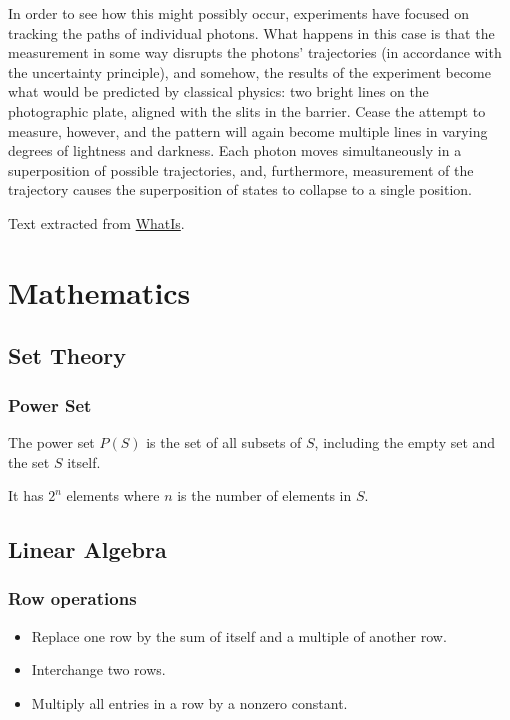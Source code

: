 \documentclass[oneside]{book} %
\theoremstyle{plain}
\begin{document}
In order to see how this might possibly occur, experiments have focused on
tracking the paths of individual photons. What happens in this case is that the
measurement in some way disrupts the photons' trajectories (in accordance with
the uncertainty principle), and somehow, the results of the experiment become
what would be predicted by classical physics: two bright lines on the
photographic plate, aligned with the slits in the barrier. Cease the attempt to
measure, however, and the pattern will again become multiple lines in varying
degrees of lightness and darkness. Each photon moves simultaneously in a
superposition of possible trajectories, and, furthermore, measurement of the
trajectory causes the superposition of states to collapse to a single position.

Text extracted from
\href{http://whatis.techtarget.com/definition/superposition}{WhatIs}.


\part{Mathematics}


\chapter{Set Theory}
\section{Power Set}
The power set \(P(S)\) is the set of all subsets of \(S\), including the empty
set and the set \(S\) itself.

It has \(2^n\) elements where \(n\) is the number of elements in \(S\).


\chapter{Linear Algebra}

\section{Row operations}
\begin{itemize}
\item{Replace one row by the sum of itself and a multiple of another row.}
\item{Interchange two rows.}
\item{Multiply all entries in a row by a nonzero constant.}
\end{itemize}
\end{document}
